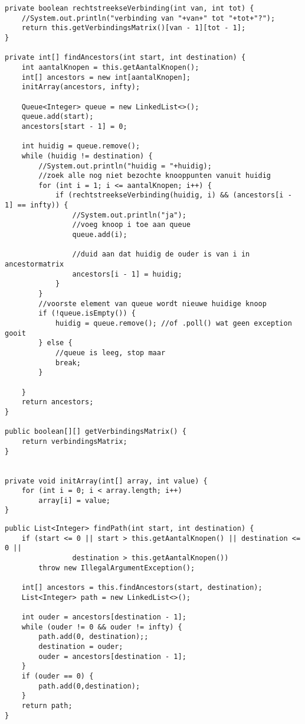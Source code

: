 \begin{Oplossing}{7.3}
\begin{lstlisting}[caption={findAncestors(int,int)}, label=BFSAncestors]
private boolean rechtstreekseVerbinding(int van, int tot) {
	//System.out.println("verbinding van "+van+" tot "+tot+"?");
	return this.getVerbindingsMatrix()[van - 1][tot - 1];
}

private int[] findAncestors(int start, int destination) {
	int aantalKnopen = this.getAantalKnopen();
	int[] ancestors = new int[aantalKnopen];
	initArray(ancestors, infty);

	Queue<Integer> queue = new LinkedList<>();
	queue.add(start);
	ancestors[start - 1] = 0;

	int huidig = queue.remove();
	while (huidig != destination) {
		//System.out.println("huidig = "+huidig);
		//zoek alle nog niet bezochte knooppunten vanuit huidig
		for (int i = 1; i <= aantalKnopen; i++) {
			if (rechtstreekseVerbinding(huidig, i) && (ancestors[i - 1] == infty)) {
				//System.out.println("ja");
				//voeg knoop i toe aan queue
				queue.add(i);
					
				//duid aan dat huidig de ouder is van i in ancestormatrix
				ancestors[i - 1] = huidig;
			}
		}
		//voorste element van queue wordt nieuwe huidige knoop
		if (!queue.isEmpty()) {
			huidig = queue.remove(); //of .poll() wat geen exception gooit
		} else {
			//queue is leeg, stop maar
			break;
		}
		
	}
	return ancestors;
}

public boolean[][] getVerbindingsMatrix() {
	return verbindingsMatrix;
}


private void initArray(int[] array, int value) {
	for (int i = 0; i < array.length; i++)
		array[i] = value;
}
\end{lstlisting}
\end{Oplossing}
\begin{Oplossing}{7.4}
\begin{lstlisting}[caption={findPath}, label=BFSfindPath]
public List<Integer> findPath(int start, int destination) {
	if (start <= 0 || start > this.getAantalKnopen() || destination <= 0 ||
				destination > this.getAantalKnopen())
		throw new IllegalArgumentException();

	int[] ancestors = this.findAncestors(start, destination);
	List<Integer> path = new LinkedList<>();

	int ouder = ancestors[destination - 1];
	while (ouder != 0 && ouder != infty) {
		path.add(0, destination);;
		destination = ouder;
		ouder = ancestors[destination - 1];
	}
	if (ouder == 0) {
		path.add(0,destination);
	}
	return path;
}
	\end{lstlisting}
\end{Oplossing}
